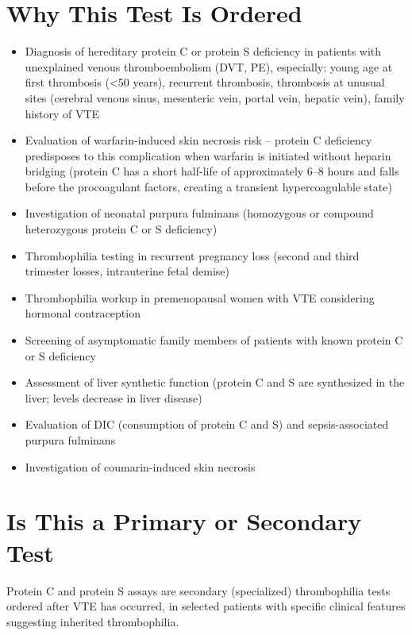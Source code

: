 \section*{Why This Test Is Ordered}
\begin{itemize}
  \item Diagnosis of hereditary protein C or protein S deficiency in patients with unexplained venous thromboembolism (DVT, PE), especially: young age at first thrombosis (<50 years), recurrent thrombosis, thrombosis at unusual sites (cerebral venous sinus, mesenteric vein, portal vein, hepatic vein), family history of VTE
  \item Evaluation of warfarin-induced skin necrosis risk -- protein C deficiency predisposes to this complication when warfarin is initiated without heparin bridging (protein C has a short half-life of approximately 6--8 hours and falls before the procoagulant factors, creating a transient hypercoagulable state)
  \item Investigation of neonatal purpura fulminans (homozygous or compound heterozygous protein C or S deficiency)
  \item Thrombophilia testing in recurrent pregnancy loss (second and third trimester losses, intrauterine fetal demise)
  \item Thrombophilia workup in premenopausal women with VTE considering hormonal contraception
  \item Screening of asymptomatic family members of patients with known protein C or S deficiency
  \item Assessment of liver synthetic function (protein C and S are synthesized in the liver; levels decrease in liver disease)
  \item Evaluation of DIC (consumption of protein C and S) and sepsis-associated purpura fulminans
  \item Investigation of coumarin-induced skin necrosis
\end{itemize}

\section*{Is This a Primary or Secondary Test}
Protein C and protein S assays are secondary (specialized) thrombophilia tests ordered after VTE has occurred, in selected patients with specific clinical features suggesting inherited thrombophilia.

